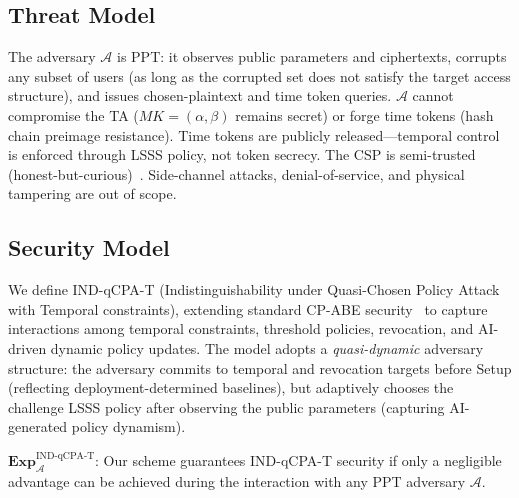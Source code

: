 \documentclass[lettersize,journal]{IEEEtran}
\begin{document}
\subsection{Threat Model}
\label{subsec:threat_model}

The adversary $\mathcal{A}$ is PPT: it observes public parameters and
ciphertexts, corrupts any subset of users (as long as the corrupted set
does not satisfy the target access structure), and issues chosen-plaintext
and time token queries. $\mathcal{A}$ cannot compromise the TA
($MK = (\alpha, \beta)$ remains secret) or forge time tokens (hash chain
preimage resistance). Time tokens are publicly released---temporal control
is enforced through LSSS policy, not token secrecy. The CSP is semi-trusted
(honest-but-curious)~\cite{Zhang2021_ABESurvey}. Side-channel attacks,
denial-of-service, and physical tampering are out of scope.

\subsection{Security Model}
\label{subsec:sec_model}

We define IND-qCPA-T (Indistinguishability under Quasi-Chosen Policy Attack
with Temporal constraints), extending standard CP-ABE
security~\cite{Zhang2021_ABESurvey, Iqal2024} to capture interactions among
temporal constraints, threshold policies, revocation, and AI-driven dynamic
policy updates. The model adopts a \emph{quasi-dynamic} adversary structure:
the adversary commits to temporal and revocation targets before Setup (reflecting
deployment-determined baselines), but adaptively chooses the challenge LSSS
policy after observing the public parameters (capturing AI-generated policy
dynamism).

$\mathbf{Exp}_{\mathcal{A}}^{\text{IND-qCPA-T}}$: Our scheme guarantees
IND-qCPA-T security if only a negligible advantage can be achieved during
the interaction with any PPT adversary $\mathcal{A}$.
\end{document}
